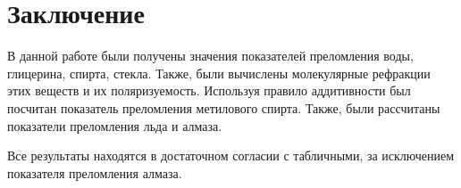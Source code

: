 \section{Заключение}
В данной работе были получены значения показателей преломления воды, глицерина, спирта, стекла. Также, были вычислены молекулярные рефракции этих веществ и их поляризуемость. Используя правило аддитивности был посчитан показатель преломления метилового спирта. Также, были рассчитаны показатели преломления льда и алмаза.

Все результаты находятся в достаточном согласии с табличными, за исключением показателя преломления алмаза.